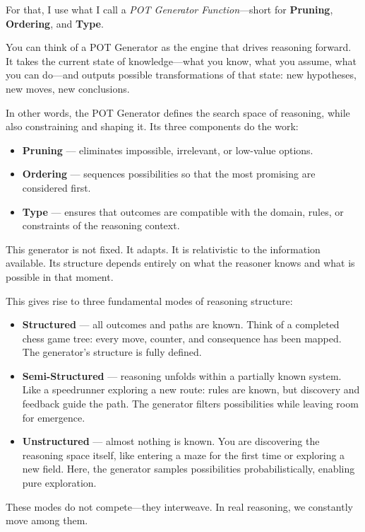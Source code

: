 \documentclass[11pt]{article}
\begin{document}
For that, I use what I call a \textit{POT Generator Function}---short for \textbf{Pruning}, \textbf{Ordering}, and \textbf{Type}.

You can think of a POT Generator as the engine that drives reasoning forward. It takes the current state of knowledge---what you know, what you assume, what you can do---and outputs possible transformations of that state: new hypotheses, new moves, new conclusions.

In other words, the POT Generator defines the search space of reasoning, while also constraining and shaping it. Its three components do the work:

\begin{itemize}
    \item \textbf{Pruning} --- eliminates impossible, irrelevant, or low-value options.
    \item \textbf{Ordering} --- sequences possibilities so that the most promising are considered first.
    \item \textbf{Type} --- ensures that outcomes are compatible with the domain, rules, or constraints of the reasoning context.
\end{itemize}

This generator is not fixed. It adapts. It is relativistic to the information available. Its structure depends entirely on what the reasoner knows and what is possible in that moment.

This gives rise to three fundamental modes of reasoning structure:

\begin{itemize}
    \item \textbf{Structured} --- all outcomes and paths are known. Think of a completed chess game tree: every move, counter, and consequence has been mapped. The generator’s structure is fully defined.
    \item \textbf{Semi-Structured} --- reasoning unfolds within a partially known system. Like a speedrunner exploring a new route: rules are known, but discovery and feedback guide the path. The generator filters possibilities while leaving room for emergence.
    \item \textbf{Unstructured} --- almost nothing is known. You are discovering the reasoning space itself, like entering a maze for the first time or exploring a new field. Here, the generator samples possibilities probabilistically, enabling pure exploration.
\end{itemize}

These modes do not compete---they interweave. In real reasoning, we constantly move among them.
\end{document}
